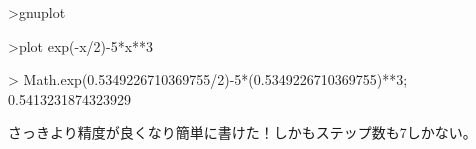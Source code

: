 >gnuplot

>plot exp(-x/2)-5*x**3

> Math.exp(0.5349226710369755/2)-5*(0.5349226710369755)**3;
0.5413231874323929

さっきより精度が良くなり簡単に書けた！しかもステップ数も7しかない。